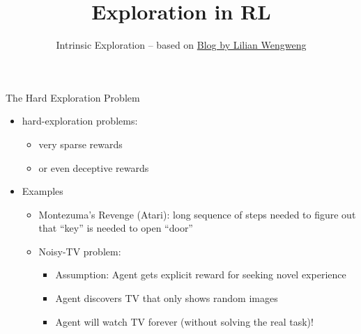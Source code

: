 


\title[RL: Exploration]{Exploration in RL}
\subtitle{Intrinsic Exploration -- based on \href{https://lilianweng.github.io/lil-log/2020/06/07/exploration-strategies-in-deep-reinforcement-learning.html}{Blog by Lilian Wengweng}}




	
	\maketitle

\begin{frame}[c]{The Hard Exploration Problem}
	
	\begin{itemize}
		\item hard-exploration problems:
		\begin{itemize}
			\item very sparse rewards 
			\item or even deceptive rewards
		\end{itemize}
		\medskip
		\pause
		\item Examples
		\begin{itemize}
			\item Montezuma's Revenge (Atari): long sequence of steps needed to figure out that ``key'' is needed to open ``door''
			\item Noisy-TV problem: 
			\begin{itemize}
				\item Assumption: Agent gets explicit reward for seeking novel experience
				\item Agent discovers TV that only shows random images
				\item Agent will watch TV forever (without solving the real task)!
			\end{itemize}
		\end{itemize}
	\end{itemize}

\end{frame}

